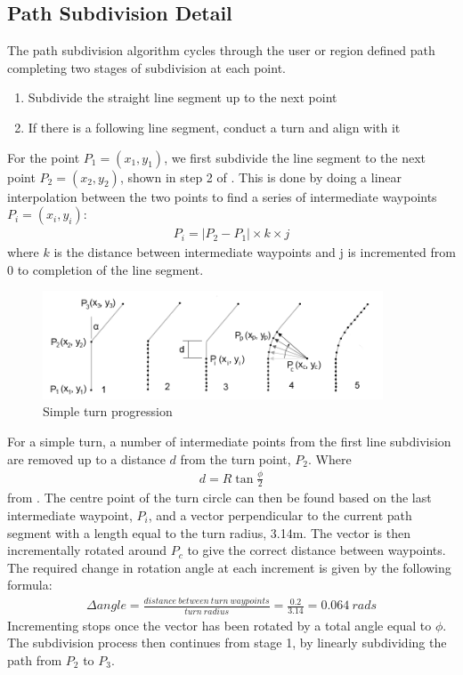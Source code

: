 \documentclass[main.tex]{subfiles}
\begin{document}
\begin{appendices}
\chapter{Path Subdivision Detail}
The path subdivision algorithm cycles through the user or region defined path completing two stages of subdivision at each point.
\begin{enumerate}
\item Subdivide the straight line segment up to the next point
\item If there is a following line segment, conduct a turn and align with it
\end{enumerate}
For the point $P_1 = (x_1, y_1)$, we first subdivide the line segment to the next point $P_2 = (x_2, y_2)$, shown in step 2 of . This is done by doing a linear interpolation between the two points to find a series of intermediate waypoints $P_i = (x_i, y_i)$:
\begin{align*}
P_i = |P_2 - P_1| \times k \times j
\end{align*}
where $k$ is the distance between intermediate waypoints and j is incremented from 0 to completion of the line segment.
\begin{figure}[ht]
\centering
\includegraphics[width=0.9\textwidth]{8-Appendices/simpleTurnProgression.png}
\caption[Simple turn progression]{Simple turn progression}
\end{figure}
For a simple turn, a number of intermediate points from the first line subdivision are removed up to a distance $d$ from the turn point, $P_2$. Where
\begin{align*}
d = R \tan \frac{\phi}{2}
\end{align*}
from . The centre point of the turn circle can then be found based on the last intermediate waypoint, $P_i$, and a vector perpendicular to the current path segment with a length equal to the turn radius, 3.14m. The vector is then incrementally rotated around $P_c$ to give the correct distance between waypoints. The required change in rotation angle at each increment is given by the following formula:
\begin{align*}
\Delta angle = \frac{distance\ between\ turn\ waypoints}{turn\ radius} = \frac{0.2}{3.14} = 0.064\ rads
\end{align*}
Incrementing stops once the vector has been rotated by a total angle equal to $\phi$. The subdivision process then continues from stage 1, by linearly subdividing the path from $P_2$ to $P_3$.


\end{appendices}
\end{document}
